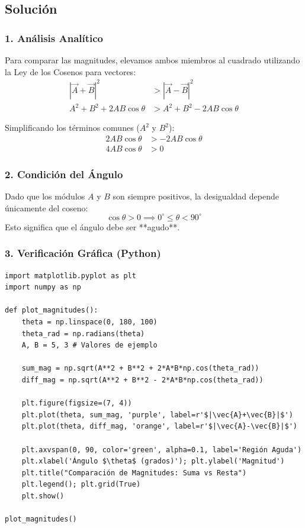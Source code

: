 \documentclass[12pt, a4paper]{article}
\begin{document}
\subsection*{Solución}

\subsubsection*{1. Análisis Analítico}
Para comparar las magnitudes, elevamos ambos miembros al cuadrado utilizando la Ley de los Cosenos para vectores:
\begin{align*}
    |\vec{A} + \vec{B}|^2 &> |\vec{A} - \vec{B}|^2 \\
    A^2 + B^2 + 2AB\cos\theta &> A^2 + B^2 - 2AB\cos\theta
\end{align*}

Simplificando los términos comunes ($A^2$ y $B^2$):
\begin{align*}
    2AB\cos\theta &> -2AB\cos\theta \\
    4AB\cos\theta &> 0
\end{align*}

\subsubsection*{2. Condición del Ángulo}
Dado que los módulos $A$ y $B$ son siempre positivos, la desigualdad depende únicamente del coseno:
\begin{equation*}
    \cos\theta > 0 \implies 0^\circ \le \theta < 90^\circ
\end{equation*}
Esto significa que el ángulo debe ser **agudo**.

\subsubsection*{3. Verificación Gráfica (Python)}
\begin{lstlisting}
import matplotlib.pyplot as plt
import numpy as np

def plot_magnitudes():
    theta = np.linspace(0, 180, 100)
    theta_rad = np.radians(theta)
    A, B = 5, 3 # Valores de ejemplo
    
    sum_mag = np.sqrt(A**2 + B**2 + 2*A*B*np.cos(theta_rad))
    diff_mag = np.sqrt(A**2 + B**2 - 2*A*B*np.cos(theta_rad))
    
    plt.figure(figsize=(7, 4))
    plt.plot(theta, sum_mag, 'purple', label=r'$|\vec{A}+\vec{B}|$')
    plt.plot(theta, diff_mag, 'orange', label=r'$|\vec{A}-\vec{B}|$')
    
    plt.axvspan(0, 90, color='green', alpha=0.1, label='Región Aguda')
    plt.xlabel('Ángulo $\theta$ (grados)'); plt.ylabel('Magnitud')
    plt.title("Comparación de Magnitudes: Suma vs Resta")
    plt.legend(); plt.grid(True)
    plt.show()

plot_magnitudes()
\end{lstlisting}
\end{document}

